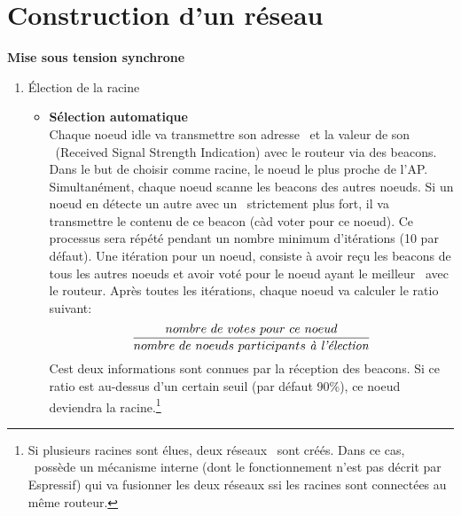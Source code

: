        \section{Construction d'un réseau}
        \textbf{Mise sous tension synchrone}\\
        \begin{enumerate}
            \item \'Election de la racine
                \begin{itemize}
                    \item \textbf{Sélection automatique}\\
                        Chaque noeud idle va transmettre son adresse \mac\ et
                        la valeur de son \rssi\ (Received Signal Strength Indication) avec le routeur via des beacons.
                        Dans le but de choisir comme racine, le noeud le plus proche de l'AP.
                        Simultanément, chaque noeud scanne les beacons des autres noeuds. Si un noeud
                        en détecte un autre avec un \rssi\ strictement plus fort, il va transmettre le contenu de
                        ce beacon (càd voter pour ce noeud).
                        Ce processus sera répété pendant un nombre minimum d'itérations (10 par défaut).
                        Une itération pour un noeud, consiste à avoir reçu les beacons de tous les autres noeuds
                        et avoir voté pour le noeud ayant le meilleur \rssi\ avec le routeur.
                        Après toutes les itérations, chaque noeud va calculer le ratio suivant: 
                        \[\frac{nombre\ de\ votes\ pour\ ce\ noeud}{nombre\ de\ noeuds\ participants\ \textrm{\textit{à l'élection}}}\]
                        Cest deux informations sont connues par la réception des beacons.
                        Si ce ratio est au-dessus d'un certain seuil (par défaut 90\%), ce noeud deviendra la racine.\footnote{
                            Si plusieurs racines sont élues, deux réseaux \espmesh\ sont créés.
                            Dans ce cas, \espmesh\ possède un mécanisme interne (dont le fonctionnement n'est pas décrit par Espressif) qui va fusionner les deux réseaux
                            ssi les racines sont connectées au même routeur.
                        }




\end{itemize}
\end{enumerate}
